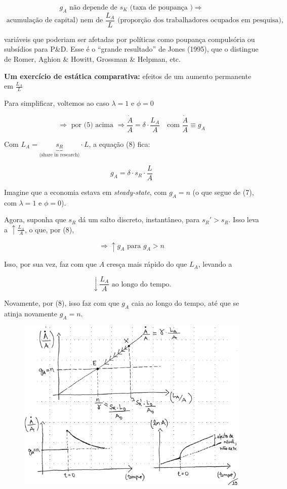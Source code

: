 \documentclass[a4paper,12pt]{article}[abntex2]
\begin{document}
\[
g_A \text{ não depende de } s_K \text{ (taxa de poupança )} \Rightarrow \]
\[
\text{ acumulação de capital) nem de } \frac{L_A}{L} 
\text{ (proporção dos trabalhadores ocupados em pesquisa),}
\]

variáveis que poderiam ser afetadas por políticas como poupança compulsória ou subsídios para P\&D. Esse é o “grande resultado” de Jones (1995), que o distingue de Romer, Aghion \& Howitt, Grossman \& Helpman, etc.


\textbf{Um exercício de estática comparativa:} efeitos de um aumento permanente em \( \frac{L_A}{L} \)

Para simplificar, voltemos ao caso \( \lambda = 1 \) e \( \phi = 0 \)

\[
\Rightarrow \text{ por (5) acima } \Rightarrow \frac{\dot{A}}{A} = \delta \cdot \frac{L_A}{A} \tag{8}
\quad \text{com } \frac{\dot{A}}{A} \equiv g_A
\]

Com \( L_A = \underbrace{s_R}_\text{(share in research)} \cdot L \), a equação (8) fica:

\[
g_A = \delta \cdot s_R \cdot \frac{L}{A} \tag{9}
\]

Imagine que a economia estava em \textit{steady-state}, com \( g_A = n \) (o que segue de (7), com \( \lambda = 1 \) e \( \phi = 0 \)).

Agora, suponha que \( s_R \) dá um salto discreto, instantâneo, para \( s_R' > s_R \). Isso leva a \( \uparrow \frac{L_A}{A} \), o que, por (8),

\[
\Rightarrow \uparrow g_A \text{ para } g_A > n
\]

Isso, por sua vez, faz com que \( A \) cresça mais rápido do que \( L_A \), levando a 

\[
\downarrow \frac{L_A}{A} \text{ ao longo do tempo.}
\]

Novamente, por (8), isso faz com que \( g_A \) caia ao longo do tempo, até que se atinja novamente \( g_A = n \).


\begin{figure}[H]
    \centering
    \includegraphics[width=0.7\linewidth]{Imagens/a15i1.png}
\end{figure}
\end{document}
